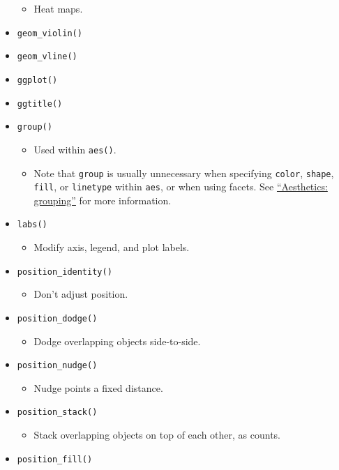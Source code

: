 \documentclass[
]{book}
\providecommand{\tightlist}{%
  \setlength{\itemsep}{0pt}\setlength{\parskip}{0pt}}
\begin{document}
\begin{itemize}
  \begin{itemize}
  \tightlist
  \item
    Heat maps.
  \end{itemize}
\item
  \texttt{geom\_violin()}
\item
  \texttt{geom\_vline()}
\item
  \texttt{ggplot()}
\item
  \texttt{ggtitle()}
\item
  \texttt{group()}

  \begin{itemize}
  \tightlist
  \item
    Used within \texttt{aes()}.
  \item
    Note that \texttt{group} is usually unnecessary when specifying \texttt{color}, \texttt{shape}, \texttt{fill}, or \texttt{linetype} within \texttt{aes}, or when using facets. See \href{https://ggplot2.tidyverse.org/reference/aes_group_order.html}{``Aesthetics: grouping''} for more information.
  \end{itemize}
\item
  \texttt{labs()}

  \begin{itemize}
  \tightlist
  \item
    Modify axis, legend, and plot labels.
  \end{itemize}
\item
  \texttt{position\_identity()}

  \begin{itemize}
  \tightlist
  \item
    Don't adjust position.
  \end{itemize}
\item
  \texttt{position\_dodge()}

  \begin{itemize}
  \tightlist
  \item
    Dodge overlapping objects side-to-side.
  \end{itemize}
\item
  \texttt{position\_nudge()}

  \begin{itemize}
  \tightlist
  \item
    Nudge points a fixed distance.
  \end{itemize}
\item
  \texttt{position\_stack()}

  \begin{itemize}
  \tightlist
  \item
    Stack overlapping objects on top of each other, as counts.
  \end{itemize}
\item
  \texttt{position\_fill()}


\end{itemize}
\end{document}
